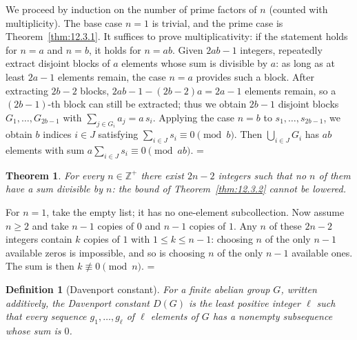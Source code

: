 \documentclass[11pt]{article}
\makeatletter
\let\nt@closedisplay\]
\def\nt@guardedclose{\@ifnextchar\par{\nt@closeafterpar}{\@ifnextchar\end{\postdisplaypenalty\@M\nt@closedisplay}{\nt@closedisplay}}}
\def\nt@closeafterpar\par{\@ifnextchar\par{\nt@closeafterpar}{\@ifnextchar\end{\postdisplaypenalty\@M\nt@closedisplay\par}{\nt@closedisplay\par}}}
\renewenvironment{proof}[1][\proofname]{\par
  \pushQED{\qed}\normalfont\topsep\medskipamount\edef\nt@afterproof{\@endparpenalty=\the\@endparpenalty\relax}\@beginparpenalty\@M\@endparpenalty\@M\let\]\nt@guardedclose\trivlist\item[]\textit{#1\@addpunct{.}} \ignorespaces}{\ifvmode\addpenalty\@M\fi\popQED\nt@afterproof\endtrivlist\@endpefalse}
\theoremstyle{ntstyle}
\newtheorem{theorem}{Theorem}[subsection]
\newtheorem{definition}{Definition}[subsection]
\makeatother
\begin{document}
\begin{proof} We proceed by induction on the number of prime factors of $n$ (counted with multiplicity). The base case $n = 1$ is trivial, and the
  prime case is Theorem~\ref{thm:12.3.1}. It suffices to prove multiplicativity:
  if the statement holds for $n = a$ and $n = b$, it holds for $n = ab$. Given $2ab - 1$ integers, repeatedly
  extract disjoint blocks of
  $a$ elements whose sum is divisible by $a$: as long as at least $2a - 1$ elements remain, the case $n = a$
  provides such a block. After
  extracting $2b - 2$ blocks, $2ab - 1 - (2b-2)a = 2a - 1$ elements
  remain, so a $(2b-1)$-th block can still be extracted; thus we obtain
  $2b - 1$ disjoint blocks $G_1, \ldots, G_{2b-1}$ with $\sum_{j \in G_i} a_j = a\, s_i$. Applying the case $n = b$
  to $s_1, \ldots, s_{2b-1}$, we obtain $b$ indices $i \in J$ satisfying $\sum_{i \in J} s_i \equiv 0 \pmod{b}$.
  Then $\bigcup_{i \in J} G_i$ has $ab$ elements with sum
  $a \sum_{i \in J} s_i \equiv 0 \pmod{ab}$.
\end{proof}

\begin{theorem}\label{thm:12.3.3} For every $n\in\mathbb{Z}^+$ there
  exist $2n - 2$ integers such that no $n$ of them have a sum divisible by $n$:
  the bound of Theorem~\ref{thm:12.3.2} cannot be lowered.

\end{theorem}

\begin{proof} For $n=1$, take the empty list; it has no one-element
  subcollection. Now assume $n\ge2$ and take $n - 1$ copies of $0$ and $n - 1$
  copies of $1$. Any $n$ of these $2n - 2$ integers contain $k$ copies
  of $1$ with $1\le k\le n - 1$: choosing $n$ of the only $n - 1$
  available zeros is impossible, and so is choosing $n$ of the only
  $n - 1$ available ones. The sum is then $k\not\equiv0\pmod{n}$.
\end{proof}

\begin{definition}[Davenport constant]\label{def:12.3.1}\label{def:davenport-constant}
  For a finite abelian group
  $G$, written additively, the Davenport constant $D(G)$ is the least
  positive integer $\ell$ such that every sequence $g_1, \ldots, g_\ell$ of $\ell$ elements of $G$ has a nonempty
  subsequence whose
  sum is $0$.

\end{definition}
\end{document}
